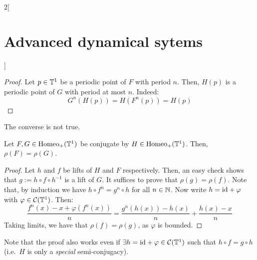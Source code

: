 \documentclass[../../../main_math.tex]{subfiles}
\begin{document}
\begin{multicols}{2}[\section{Advanced dynamical sytems}]
\begin{lemma}
  \end{lemma}
  \begin{proof}
    Let $p\in \mathbb{T}^1$ be a periodic point of $F$ with period $n$. Then, $H(p)$ is a periodic point of $G$ with period at most $n$. Indeed:
    $$
      G^n(H(p))=H(F^n(p))=H(p)
    $$
  \end{proof}
  \begin{remark}
    The converse is not true.
  \end{remark}
  \begin{theorem}\label{ADS:invariance_rho}
    Let $F,G\in\mathrm{Homeo}_+(\mathbb{T}^1)$ be conjugate by $H\in \mathrm{Homeo}_+(\mathbb{T}^1)$. Then, $\rho(F)=\rho(G)$.
  \end{theorem}
  \begin{proof}
    Let $h$ and $f$ be lifts of $H$ and $F$ respectively. Then, an easy check shows that $g:=h\circ f\circ h^{-1}$ is a lift of $G$. It suffices to prove that $\rho(g)=\rho(f)$. Note that, by induction we have $h\circ f^n=g^n\circ h$ for all $n\in\mathbb{N}$. Now write $h=\mathrm{id} + \varphi$ with $\varphi\in \mathcal{C}(\mathbb{T}^1)$. Then:
    \begin{equation*}
      \frac{f^n(x)-x+\varphi(f^n(x))}{n}= \frac{g^n(h(x))-h(x)}{n}+\frac{h(x)-x}{n}
    \end{equation*}
    Taking limits, we have that $\rho(f)=\rho(g)$, as $\varphi$ is bounded.
  \end{proof}
  \begin{remark}
    Note that the proof also works even if $\exists h=\mathrm{id}+\varphi\in \mathcal{C}(\mathbb{T}^1)$ such that $h\circ f=g\circ h$ (i.e.\ $H$ is only a \textit{special} semi-conjugacy).
  \end{remark}

\end{multicols}
\end{document}

